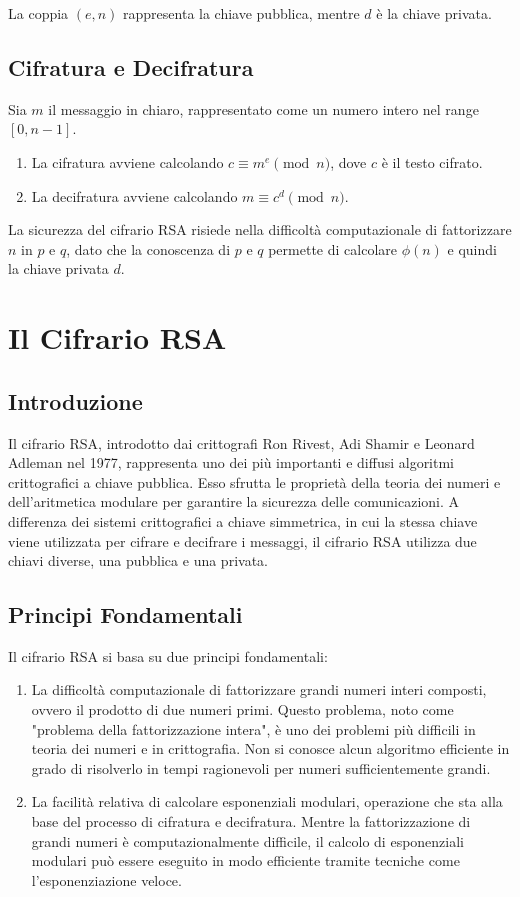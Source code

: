 \documentclass[a4paper,12pt]{report}
\begin{document}
La coppia $(e, n)$ rappresenta la chiave pubblica, mentre $d$ è la chiave privata.

\section{Cifratura e Decifratura}
Sia $m$ il messaggio in chiaro, rappresentato come un numero intero nel range $[0, n - 1]$.

\begin{enumerate}
    \item La cifratura avviene calcolando $c \equiv m^e \pmod{n}$, dove $c$ è il testo cifrato.
    \item La decifratura avviene calcolando $m \equiv c^d \pmod{n}$.
\end{enumerate}

La sicurezza del cifrario RSA risiede nella difficoltà computazionale di fattorizzare $n$ in $p$ e $q$, dato che la conoscenza di $p$ e $q$ permette di calcolare $\phi(n)$ e quindi la chiave privata $d$.

\chapter{Il Cifrario RSA}

\section{Introduzione}
Il cifrario RSA, introdotto dai crittografi Ron Rivest, Adi Shamir e Leonard Adleman nel 1977, rappresenta uno dei più importanti e diffusi algoritmi crittografici a chiave pubblica. Esso sfrutta le proprietà della teoria dei numeri e dell'aritmetica modulare per garantire la sicurezza delle comunicazioni. A differenza dei sistemi crittografici a chiave simmetrica, in cui la stessa chiave viene utilizzata per cifrare e decifrare i messaggi, il cifrario RSA utilizza due chiavi diverse, una pubblica e una privata.

\section{Principi Fondamentali}
Il cifrario RSA si basa su due principi fondamentali:

\begin{enumerate}
    \item La difficoltà computazionale di fattorizzare grandi numeri interi composti, ovvero il prodotto di due numeri primi. Questo problema, noto come "problema della fattorizzazione intera", è uno dei problemi più difficili in teoria dei numeri e in crittografia. Non si conosce alcun algoritmo efficiente in grado di risolverlo in tempi ragionevoli per numeri sufficientemente grandi.
    \item La facilità relativa di calcolare esponenziali modulari, operazione che sta alla base del processo di cifratura e decifratura. Mentre la fattorizzazione di grandi numeri è computazionalmente difficile, il calcolo di esponenziali modulari può essere eseguito in modo efficiente tramite tecniche come l'esponenziazione veloce.
\end{enumerate}
\end{document}
